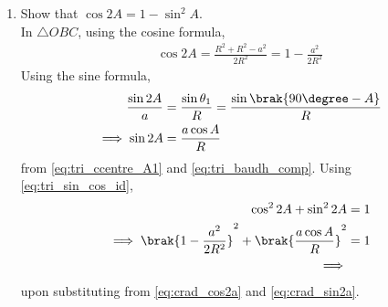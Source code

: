 \renewcommand{\theequation}{\theenumi}
\begin{enumerate}[label=\arabic*.,ref=\thesubsection.\theenumi]

\item Show that $\cos 2A = 1 -\sin^2 A$.
\\
\solution In $\triangle OBC$, using the cosine formula, 
\begin{align}
\cos 2A = \frac{R^2+R^2 - a^2}{2R^2} = 1 -\frac{a^2}{2R^2}
\label{eq:crad_cos2a}
\end{align}
%
Using the sine formula, 
\begin{align}
\frac{\sin 2A}{a} &= \frac{\sin \theta_1}{R} = \frac{\sin\brak{90\degree- A}}{R}
\\
\implies \sin 2A &= \frac{a\cos A}{R}
\label{eq:crad_sin2a}
\end{align}
%
from \eqref{eq:tri_ccentre_A1} and \eqref{eq:tri_baudh_comp}.	Using \eqref{eq:tri_sin_cos_id}, 
\begin{align}
\cos^2 2A + \sin^2 2A&= 1
\\
\implies \brak{1 -\frac{a^2}{2R^2}}^2 + \brak{\frac{a\cos A}{R}}^2 &= 1
\\
\implies 
\end{align}
%
upon substituting from \eqref{eq:crad_cos2a}  and \eqref{eq:crad_sin2a}.




\end{enumerate}

